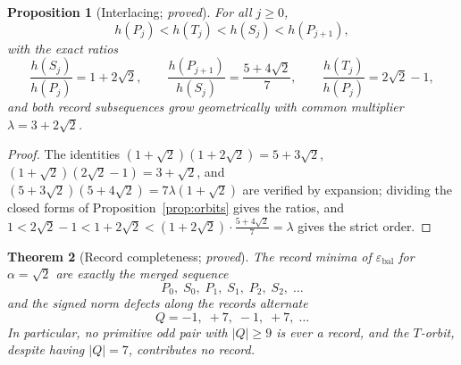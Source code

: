 \documentclass[11pt]{article}
\newtheorem{theorem}{Theorem}[section]
\newtheorem{proposition}[theorem]{Proposition}
\theoremstyle{definition}
\theoremstyle{remark}
\newcommand{\eb}{\varepsilon_{\mathrm{bal}}}
\newcommand{\lam}{\lambda}
\begin{document}
\begin{proposition}[Interlacing; \emph{proved}]\label{prop:interlace}
For all $j\ge0$,
\[
h(P_j)<h(T_j)<h(S_j)<h(P_{j+1}),
\]
with the exact ratios
\[
\frac{h(S_j)}{h(P_j)}=1+2\sqrt2,\qquad
\frac{h(P_{j+1})}{h(S_j)}=\frac{5+4\sqrt2}{7},\qquad
\frac{h(T_j)}{h(P_j)}=2\sqrt2-1 ,
\]
and both record subsequences grow geometrically with common multiplier $\lam=3+2\sqrt2$.
\end{proposition}

\begin{proof}
The identities $(1+\sqrt2)(1+2\sqrt2)=5+3\sqrt2$, $(1+\sqrt2)(2\sqrt2-1)=3+\sqrt2$, and $(5+3\sqrt2)(5+4\sqrt2)=7\lam(1+\sqrt2)$ are verified by expansion; dividing the closed forms of Proposition~\ref{prop:orbits} gives the ratios, and $1<2\sqrt2-1<1+2\sqrt2<(1+2\sqrt2)\cdot\frac{5+4\sqrt2}{7}=\lam$ gives the strict order.
\end{proof}

\begin{theorem}[Record completeness; \emph{proved}]\label{thm:complete}
The record minima of $\eb$ for $\alpha=\sqrt2$ are exactly the merged sequence
\[
P_0,\;S_0,\;P_1,\;S_1,\;P_2,\;S_2,\;\dots
\]
and the signed norm defects along the records alternate
\[
Q=-1,\;+7,\;-1,\;+7,\;\dots
\]
In particular, no primitive odd pair with $|Q|\ge9$ is ever a record, and the $T$-orbit, despite having $|Q|=7$, contributes no record.
\end{theorem}
\end{document}
